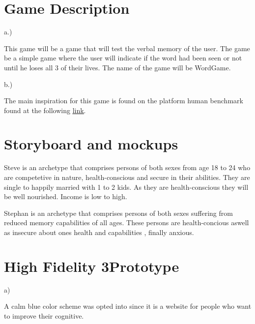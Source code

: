 \section{Game Description}
a.)\hspace{10pt}\parbox{12cm}{This game will be a game that will test the verbal memory of the user. The game be a simple game where the user will indicate if the word had been seen or not until he loses all 3 of their lives. The name of the game will be WordGame.}\newline\newline

b.)\hspace{10pt}\parbox{12cm}{The main inspiration for this game is found on the platform human benchmark found at the following \underline{\href{https://humanbenchmark.com/tests/verbal-memory}{link}}.}
\section{Storyboard and mockups}
\begin{list}{ }{ }
    \item Steve is an archetype that comprises persons of both sexes from age 18 to 24 who are competetive in nature, health-conscious and secure in their abilities. They are single to happily married with 1 to 2 kids. As they are health-conscious they will be well nourished. Income is low to high.
    \item Stephan is an archetype that comprises persons of both sexes suffering from reduced memory capabilities of all ages. These persons are health-concious aswell as insecure about ones health and capabilities , finally anxious.
\end{list}
\section{High Fidelity 3Prototype}
a)\parbox{12cm}{A calm blue color scheme was opted into since it is a website for people who want to improve their cognitive. }

